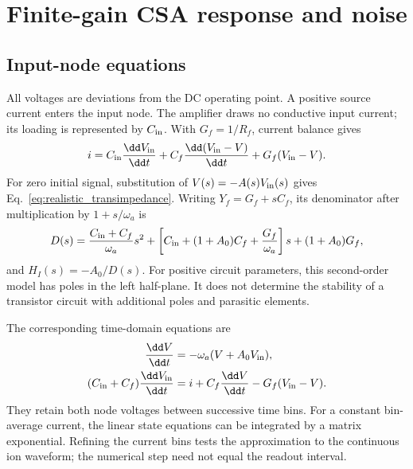 \section{Finite-gain CSA response and noise}
\label{app:realistic_csa}

\subsection{Input-node equations}

All voltages are deviations from the DC operating point. A positive source current enters the input node. The amplifier draws no conductive input current; its loading is represented by $C_{\rm in}$. With $G_f=1/R_f$, current balance gives
\begin{equation}
 i=C_{\rm in}\frac{\dd V_{\rm in}}{\dd t}
   +C_f\frac{\dd(V_{\rm in}-V)}{\dd t}
   +G_f(V_{\rm in}-V).
 \label{eq:app_realistic_kcl}
\end{equation}
For zero initial signal, substitution of $V(s)=-A(s)V_{\rm in}(s)$ gives Eq.~\eqref{eq:realistic_transimpedance}. Writing $Y_f=G_f+sC_f$, its denominator after multiplication by $1+s/\omega_a$ is
\begin{equation}
 D(s)=\frac{C_{\rm in}+C_f}{\omega_a}s^2
 +\left[C_{\rm in}+(1+A_0)C_f+\frac{G_f}{\omega_a}\right]s
 +(1+A_0)G_f,
 \label{eq:app_realistic_denominator}
\end{equation}
and $H_I(s)=-A_0/D(s)$. For positive circuit parameters, this second-order model has poles in the left half-plane. It does not determine the stability of a transistor circuit with additional poles and parasitic elements.

The corresponding time-domain equations are
\begin{align}
 \frac{\dd V}{\dd t}&=-\omega_a(V+A_0V_{\rm in}),\\
 (C_{\rm in}+C_f)\frac{\dd V_{\rm in}}{\dd t}
 &=i+C_f\frac{\dd V}{\dd t}-G_f(V_{\rm in}-V).
 \label{eq:app_realistic_state}
\end{align}
They retain both node voltages between successive time bins. For a constant bin-average current, the linear state equations can be integrated by a matrix exponential. Refining the current bins tests the approximation to the continuous ion waveform; the numerical step need not equal the readout interval.

